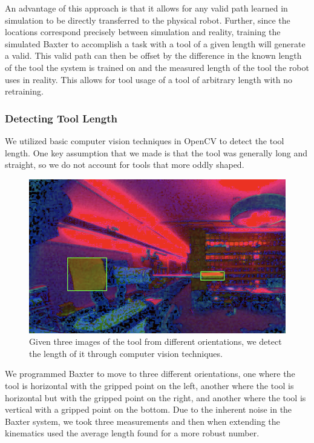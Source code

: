 \documentclass[conference]{IEEEtran}
\begin{document}
An advantage of this approach is that it allows for any valid path learned in simulation to be directly transferred to the physical robot. Further, since the locations correspond precisely between simulation and reality, training the simulated Baxter to accomplish a task with a tool of a given length will generate a valid. This valid path can then be offset by the difference in the known length of the tool the system is trained on and the measured length of the tool the robot uses in reality. This allows for tool usage of a tool of arbitrary length with no retraining. 

\vspace{2mm}
\subsubsection{Detecting Tool Length}
We utilized basic computer vision techniques in OpenCV to detect the tool length. One key assumption that we made is that the tool was generally long and straight, so we do not account for tools that more oddly shaped. 
\begin{figure}[h!]
\centering
 \includegraphics[scale=0.6]{length.png}
 \caption{Given three images of the tool from different orientations, we detect the length of it through computer vision techniques.}
 \label{fig:result2}
\end{figure} 

We programmed Baxter to move to three different orientations, one where the tool is horizontal with the gripped point on the left, another where the tool is horizontal but with the gripped point on the right, and another where the tool is vertical with a gripped point on the bottom. Due to the inherent noise in the Baxter system, we took three measurements and then when extending the kinematics used the average length found for a more robust number.
\end{document}
